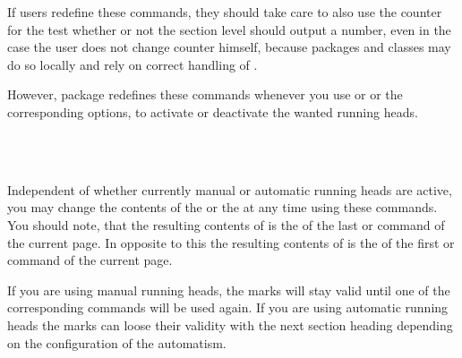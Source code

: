 If users redefine these commands, they should take care
to also use the counter  for the test whether or not the
section level should output a number, even in the case the user
does not change counter  himself, because packages and
classes may do so locally and rely on correct handling of
.

However, package  redefines these commands whenever you use
 or  or the corresponding options, to
activate or deactivate the wanted running heads.%
%
%
%
%
%
%
%
%

\begin{Declaration}
  \\
  \\
\end{Declaration}
%
%
%
Independent of whether currently manual or automatic running heads are active,
you may change the contents of the  or the 
at any time using these commands. You should note, that the resulting contents
of  is the  of the last  or  command of the
current page. In opposite to this the resulting contents of
 is the  of the first
 or  command of the current page.

If you are using manual running heads, the marks will stay valid until one of
the corresponding commands will be used again. If you are using automatic
running heads the marks can loose their validity with the next section heading
depending on the configuration of the automatism.

